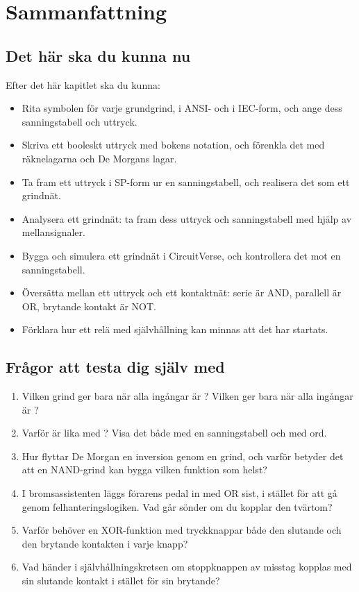 
\section{Sammanfattning}
\label{c2:sec:summary}

\subsection*{Det här ska du kunna nu}
Efter det här kapitlet ska du kunna:
\begin{itemize}
  \item Rita symbolen för varje grundgrind, i ANSI- och i IEC-form, och ange dess sanningstabell och
    uttryck.
  \item Skriva ett booleskt uttryck med bokens notation, och förenkla det med räknelagarna och De
    Morgans lagar.
  \item Ta fram ett uttryck i SP-form ur en sanningstabell, och realisera det som ett grindnät.
  \item Analysera ett grindnät: ta fram dess uttryck och sanningstabell med hjälp av
    mellansignaler.
  \item Bygga och simulera ett grindnät i CircuitVerse, och kontrollera det mot en sanningstabell.
  \item Översätta mellan ett uttryck och ett kontaktnät: serie är AND, parallell är OR, brytande
    kontakt är NOT.
  \item Förklara hur ett relä med självhållning kan minnas att det har startats.
\end{itemize}

\subsection*{Frågor att testa dig själv med}
\begin{enumerate}
  \item Vilken grind ger  bara när alla ingångar är ? Vilken ger  bara när
    alla ingångar är ?
  \item Varför är \mbox{} lika med \mbox{}? Visa det både med en
    sanningstabell och med ord.
  \item Hur flyttar De Morgan en inversion genom en grind, och varför betyder det att en NAND-grind
    kan bygga vilken funktion som helst?
  \item I bromsassistenten läggs förarens pedal in med OR sist, i stället för att gå genom
    felhanteringslogiken. Vad går sönder om du kopplar den tvärtom?
  \item Varför behöver en XOR-funktion med tryckknappar både den slutande och den brytande
    kontakten i varje knapp?
  \item Vad händer i självhållningskretsen om stoppknappen av misstag kopplas med sin slutande
    kontakt i stället för sin brytande?
\end{enumerate}

